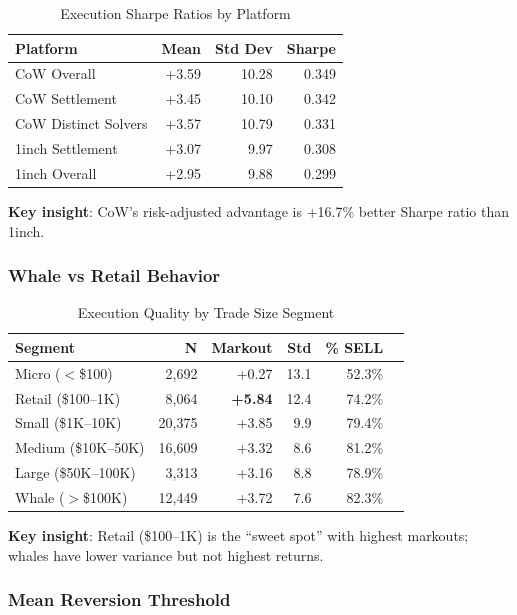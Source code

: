 \documentclass[12pt,a4paper]{article}
\begin{document}
\begin{table}[H]
\centering
\caption{Execution Sharpe Ratios by Platform}
\begin{tabular}{lrrr}
\toprule
\textbf{Platform} & \textbf{Mean} & \textbf{Std Dev} & \textbf{Sharpe} \\
\midrule
CoW Overall & +3.59 & 10.28 & 0.349 \\
CoW Settlement & +3.45 & 10.10 & 0.342 \\
CoW Distinct Solvers & +3.57 & 10.79 & 0.331 \\
1inch Settlement & +3.07 & 9.97 & 0.308 \\
1inch Overall & +2.95 & 9.88 & 0.299 \\
\bottomrule
\end{tabular}
\end{table}

\textbf{Key insight}: CoW's risk-adjusted advantage is +16.7\% better Sharpe ratio than 1inch.

\subsubsection{Whale vs Retail Behavior}

\begin{table}[H]
\centering
\caption{Execution Quality by Trade Size Segment}
\begin{tabular}{lrrrrr}
\toprule
\textbf{Segment} & \textbf{N} & \textbf{Markout} & \textbf{Std} & \textbf{\% SELL} \\
\midrule
Micro ($<$\$100) & 2,692 & +0.27 & 13.1 & 52.3\% \\
Retail (\$100--1K) & 8,064 & \textbf{+5.84} & 12.4 & 74.2\% \\
Small (\$1K--10K) & 20,375 & +3.85 & 9.9 & 79.4\% \\
Medium (\$10K--50K) & 16,609 & +3.32 & 8.6 & 81.2\% \\
Large (\$50K--100K) & 3,313 & +3.16 & 8.8 & 78.9\% \\
Whale ($>$\$100K) & 12,449 & +3.72 & 7.6 & 82.3\% \\
\bottomrule
\end{tabular}
\end{table}

\textbf{Key insight}: Retail (\$100--1K) is the ``sweet spot'' with highest markouts; whales have lower variance but not highest returns.

\subsubsection{Mean Reversion Threshold}
\end{document}
